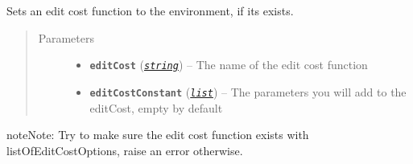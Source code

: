 \documentclass[letterpaper,10pt,english]{sphinxmanual}
\begin{document}
\begin{fulllineitems}
\label{doc:PythonGedLib.PySetEditCost}
Sets an edit cost function to the environment, if its exists.
\begin{quote}\begin{description}
\item[{Parameters}] \leavevmode\begin{itemize}
\item {} 
\textbf{\texttt{editCost}} (\href{https://docs.python.org/3/library/string.html\#module-string}{\emph{\texttt{string}}}) -- The name of the edit cost function

\item {} 
\textbf{\texttt{editCostConstant}} (\href{https://docs.python.org/3/library/stdtypes.html\#list}{\emph{\texttt{list}}}) -- The parameters you will add to the editCost, empty by default

\end{itemize}

\end{description}\end{quote}

\begin{notice}{note}{Note:}
Try to make sure the edit cost function exists with listOfEditCostOptions, raise an error otherwise.
\end{notice}

\end{fulllineitems}

\end{document}
